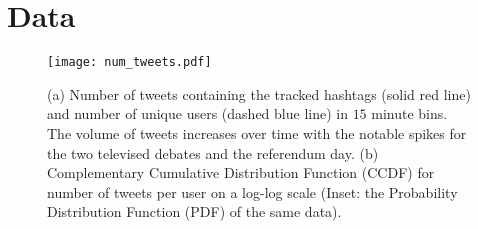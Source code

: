 \documentclass{article}
\begin{document}
\section{Data}\label{sec:datacollection}


\begin{figure}[tp]
  \centering
  \texttt{[image: num\_tweets.pdf]}
  \caption{(a) Number of tweets containing the tracked hashtags (solid
    red line) and number of unique users (dashed blue line) in $15$
    minute bins. The volume of tweets increases over time with the
    notable spikes for the two televised debates and the referendum
    day. (b) Complementary Cumulative Distribution Function (CCDF) for
    number of tweets per user on a log-log scale (Inset: the
    Probability Distribution Function (PDF) of the same
    data).}\label{fig:tweetDist}
\end{figure}
\end{document}
